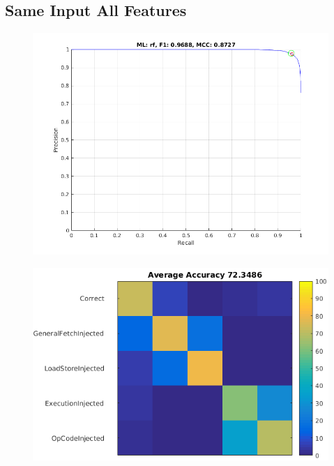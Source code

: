 \documentclass{sig-alternate}
\begin{document}
\subsection{Same Input All Features}

\begin{figure}[t]
\begin{center}
   \includegraphics[width=0.95\linewidth]{./figures/siaf.png}
\end{center}
   \caption{}
\label{fig:siaf}
\end{figure}

\begin{figure}[t]
\begin{center}
   \includegraphics[width=0.95\linewidth]{./figures/siaf_multi.png}
\end{center}
   \caption{}
\label{fig:siaf-multi}
\end{figure}
\end{document}
